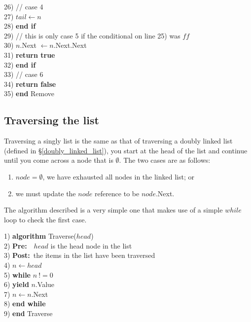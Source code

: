 \begin{tabbing}
26) \> \> \> // case 4 \\
27) \> \> \> $tail \leftarrow n$ \\
28) \> \> \textbf{end if} \\
29) \> \> // this is only case 5 if the conditional on line 25) was $ff$ \\
30) \> \> $n$.Next $\leftarrow n$.Next.Next \\
31) \> \> \textbf{return true} \\
32) \> \textbf{end if} \\
33) \> // case 6 \\
34) \> \textbf{return false} \\
35) \textbf{end} Remove \\
\end{tabbing}

\subsection{Traversing the list} \label{singly_linked_traversal}
Traversing a singly list is the same as that of traversing a doubly linked list (defined in \S\ref{doubly_linked_list}), you start at the head of the list and continue until you come across a node that is $\emptyset$. The two cases are as follows:

\begin{enumerate}
\item $node = \emptyset$, we have exhausted all nodes in the linked list; or
\item we must update the $node$ reference to be $node$.Next.
\end{enumerate}

The algorithm described is a very simple one that makes use of a simple $while$ loop to check the first case. 

\newpage
\begin{tabbing}
1)  \textbf{alg}\= \textbf{orithm} Traverse($head$) \\
2)  \> \textbf{Pre:}~~$head$ is the head node in the list \\
3)  \> \textbf{Post:}~the items in the list have been traversed \\
4)  \> $n \leftarrow head$ \\
5)  \> \textbf{whi}\=\textbf{le} $n~!= 0$ \\
6)  \> \> \textbf{yield} $n$.Value \\
7)  \> \> $n \leftarrow n$.Next \\
8)  \> \textbf{end while} \\
9)  \textbf{end} Traverse \\
\end{tabbing}

